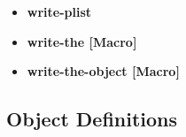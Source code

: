 \documentclass [11pt]{book}
\begin{document}
\begin{itemize}
\item {}
\label{prim:write-plist}
\textbf{write-plist}





\item {}
\label{prim:write-the}
\textbf{write-the [Macro]}





\item {}
\label{prim:write-the-object}
\textbf{write-the-object [Macro]}






\end{itemize}



\subsection{Object Definitions}
\end{document}
